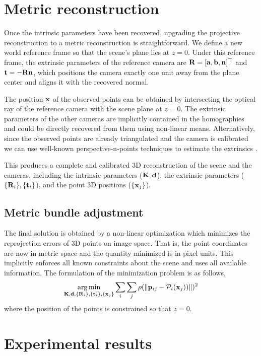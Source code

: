 \documentclass[10pt,twocolumn,letterpaper]{article}
\begin{document}
\section{Metric reconstruction}
\label{section:metric}

Once the intrinsic parameters have been recovered, upgrading the projective reconstruction to a metric reconstruction is straightforward. We define a new world reference frame so that the scene's plane lies at $z=0$. Under this reference frame, the extrinsic parameters of the reference camera are $\mathbf{R}=[\mathbf{a}, \mathbf{b}, \mathbf{n}]^\top$ and $\mathbf{t}= - \mathbf{R} \mathbf{n}$, which positions the camera exactly one unit away from the plane center and aligns it with the recovered normal.

The position $\mathbf{x}$ of the observed points can be obtained by intersecting the optical ray of the reference camera with the scene plane at $z=0$. The extrinsic parameters of the other cameras are implicitly contained in the homographies and could be directly recovered from them using non-linear means. Alternatively, since the observed points are already triangulated and the camera is calibrated we can use well-known perspective-n-points techniques to estimate the extrinsics \cite{quan1999}.

This produces a complete and calibrated 3D reconstruction of the scene and the cameras, including the intrinsic parameters ($\mathbf{K},\mathbf{d}$), the extrinsic parameters ($\lbrace \mathbf{R}_i \rbrace,\lbrace \mathbf{t}_i \rbrace$), and the point 3D positions ($\lbrace \mathbf{x}_j \rbrace$).

\subsection{Metric bundle adjustment}

The final solution is obtained by a non-linear optimization which minimizes the reprojection errors of 3D points on image space. That is, the point coordinates are now in metric space and the quantity minimized is in pixel units. This implicitly enforces all known constraints about the scene and uses all available information. The formulation of the minimization problem is as follows, 
%
\begin{align}
\argmin_{\Km,\dv,\lbrace \Rm_i \rbrace,\lbrace \tv_i \rbrace, \lbrace \xv_j \rbrace} 
%
\sum_i \sum_j \rho(\norm{\pv_{ij} - \Projection_i(\xv_j))})^2 
\end{align}
%
where the position of the points is constrained so that $z=0$. 

\section{Experimental results}
\label{sec:results}
\end{document}
